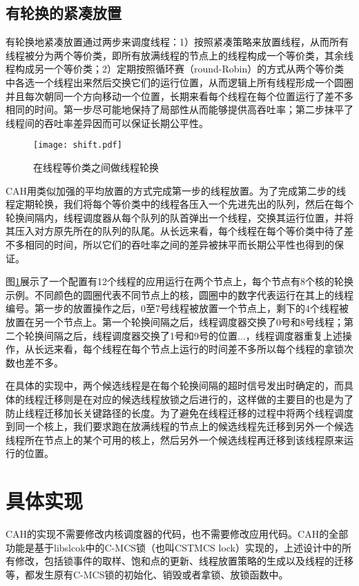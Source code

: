 \subsection{有轮换的紧凑放置}
有轮换地紧凑放置通过两步来调度线程：1）按照紧凑策略来放置线程，从而所有线程被分为两个等价类，即所有放满线程的节点上的线程构成一个等价类，其余线程构成另一个等价类；2）定期按照循环赛（round-Robin）的方式从两个等价类中各选一个线程出来然后交换它们的运行位置，从而逻辑上所有线程形成一个圆圈并且每次朝同一个方向移动一个位置，长期来看每个线程在每个位置运行了差不多相同的时间。第一步尽可能地保持了局部性从而能够提供高吞吐率；第二步抹平了线程间的吞吐率差异因而可以保证长期公平性。
\begin{figure}[t]
	\centering
	\texttt{[image: shift.pdf]}
	\caption{在线程等价类之间做线程轮换}
	\label{Fig:shift}
\end{figure}

CAH用类似加强的平均放置的方式完成第一步的线程放置。为了完成第二步的线程定期轮换，我们将每个等价类中的线程各压入一个先进先出的队列，然后在每个轮换间隔内，线程调度器从每个队列的队首弹出一个线程，交换其运行位置，并将其压入对方原先所在的队列的队尾。从长远来看，每个线程在每个等价类中待了差不多相同的时间，所以它们的吞吐率之间的差异被抹平而长期公平性也得到的保证。

图\ref{Fig:shift}展示了一个配置有12个线程的应用运行在两个节点上，每个节点有8个核的轮换示例。不同颜色的圆圈代表不同节点上的核，圆圈中的数字代表运行在其上的线程编号。第一步的放置操作之后，0至7号线程被放置一个节点上，剩下的4个线程被放置在另一个节点上。第一个轮换间隔之后，线程调度器交换了0号和8号线程；第二个轮换间隔之后，线程调度器交换了1号和9号的位置...，线程调度器重复上述操作，从长远来看，每个线程在每个节点上运行的时间差不多所以每个线程的拿锁次数也差不多。

在具体的实现中，两个候选线程是在每个轮换间隔的超时信号发出时确定的，而具体的线程迁移则是在对应的候选线程放锁之后进行的，这样做的主要目的也是为了防止线程迁移加长关键路径的长度。为了避免在线程迁移的过程中将两个线程调度到同一个核上，我们要求跑在放满线程的节点上的候选线程先迁移到另外一个候选线程所在节点上的某个可用的核上，然后另外一个候选线程再迁移到该线程原来运行的位置。

\section{具体实现}
CAH的实现不需要修改内核调度器的代码，也不需要修改应用代码。CAH的全部功能是基于libslcok\cite{kashyap2017scalable}中的C-MCS锁（也叫CSTMCS lock）实现的，上述设计中的所有修改，包括锁事件的取样、饱和点的更新、线程放置策略的生成以及线程的迁移等，都发生原有C-MCS锁的初始化、销毁或者拿锁、放锁函数中。

